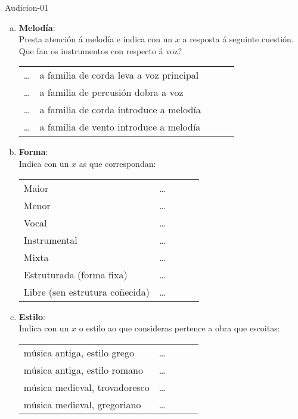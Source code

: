 \begin{defproblem}{Audicion-01}
\begin{ejercicio}[]
\begin{enumerate}[1.-]
\begin{multicols}{2}
\begin{enumerate}[a)]
            \normalsize
		    \item
			\textbf{Melodía}: \\
				\small{
				Presta atención á melodía e indica con un $x$ a resposta á seguinte cuestión. 
				Que fan os instrumentos con respecto á voz? 
				}
				\par
            \normalsize	
               \par
			\begin{tabular}{lllll} 
			    \ldots & \small{a familia de corda leva a voz principal} & & \\
			    \ldots & \small{a familia de percusión dobra a voz} & & \\
			    \ldots & \small{a familia de corda introduce a melodía} & & \\
			    \ldots & \small{a familia de vento introduce a melodía} & & \\

			\end{tabular}
            \normalsize
            \item
			\textbf{Forma}: \\
				\small{Indica con un $x$ as que correspondan:} \par
			\begin{tabular}{lllll} 
			     \small{Maior} & \ldots \\ 
			     \small{Menor} & \ldots \\ 
			     \small{Vocal} & \ldots \\ 
			     \small{Instrumental} & \ldots \\ 
			     \small{Mixta} & \ldots \\ 
			     \small{Estruturada (forma fixa)} & \ldots \\ 
			     \small{Libre (sen estrutura coñecida)} & \ldots \\ 
			\end{tabular}
            \normalsize
		    \item
			\textbf{Estilo}: \\
				\small{Indica con un $x$ o estilo ao que consideras pertence a obra que escoitas:} \par
			\begin{tabular}{lllll} 
			     \small{música antiga, estilo grego} & \ldots \\ 
			     \small{música antiga, estilo romano} & \ldots \\
			     \small{música medieval, trovadoresco} & \ldots \\
			     \small{música medieval, gregoriano } & \ldots \\			     
			\end{tabular}
		    \end{enumerate}
%			
       \end{multicols}
\par \vspace{0.3cm}
	\end{enumerate}
\end{ejercicio}


\end{defproblem}
